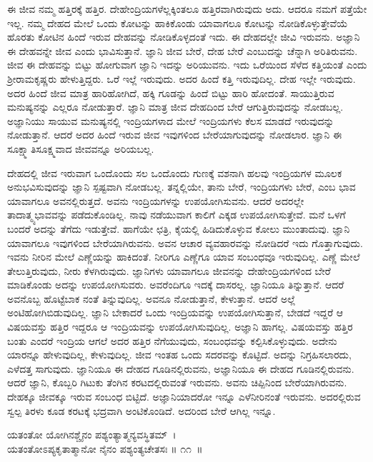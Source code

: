 ಈ ಜೀವ ನಮ್ಮ ಹತ್ತಿರಕ್ಕೆ ಹತ್ತಿರ. ದೇಹೇಂದ್ರಿಯಗಳೆಲ್ಲಕ್ಕಿಂತಲೂ ಹತ್ತಿರವಾಗಿರುವುದು ಅದು. ಆದರೂ ನಮಗೆ ಪತ್ತೆಯೇ ಇಲ್ಲ. ನಮ್ಮ ದೇಹದ ಮೇಲೆ ಒಂದು ಕೋಟನ್ನು ಹಾಕಿಕೊಂಡು ಯಾವಾಗಲೂ ಕೋಟನ್ನು ನೋಡಿಕೊಳ್ಳುತ್ತೇವೆಯೆ ಹೊರತು ಕೋಟಿನ ಹಿಂದೆ ಇರುವ ದೇಹವನ್ನು ನೋಡಿಕೊಳ್ಳದಂತೆ ಇದು. ಈ ದೇಹದಲ್ಲೇ ಜೀವಿ ಇರುವನು. ಅಜ್ಞಾನಿ ಈ ದೇಹವನ್ನೇ ಜೀವ ಎಂದು ಭಾವಿಸುತ್ತಾನೆ. ಜ್ಞಾನಿ ಜೀವ ಬೇರೆ, ದೇಹ ಬೇರೆ ಎಂಬುದನ್ನು ಚೆನ್ನಾಗಿ ಅರಿತಿರುವನು. ಜೀವ ಈ ದೇಹವನ್ನು ಬಿಟ್ಟು ಹೋಗುವಾಗ ಜ್ಞಾನಿ ಇದನ್ನು ಅರಿಯುವನು. ಇದು ಒರೆಯಿಂದ ಸೆಳೆದ ಕತ್ತಿಯಂತೆ ಎಂದು ಶ‍್ರೀರಾಮಕೃಷ್ಣರು ಹೇಳುತ್ತಿದ್ದರು. ಒರೆ ಇಲ್ಲೆ ಇರುವುದು. ಅದರ ಹಿಂದೆ ಕತ್ತಿ ಇರುವುದಿಲ್ಲ. ದೇಹ ಇಲ್ಲೇ ಇರುವುದು. ಅದರ ಹಿಂದೆ ಜೀವ ಮಾತ್ರ ಹಾರಿಹೋಗಿದೆ, ಹಕ್ಕಿ ಗೂಡನ್ನು ಹಿಂದೆ ಬಿಟ್ಟು ಹಾರಿ ಹೋದಂತೆ. ಸಾಯುತ್ತಿರುವ ಮನುಷ್ಯನನ್ನು ಎಲ್ಲರೂ ನೋಡುತ್ತಾರೆ. ಜ್ಞಾನಿ ಮಾತ್ರ ಜೀವ ದೇಹದಿಂದ ಬೇರೆ ಆಗುತ್ತಿರುವುದನ್ನು ನೋಡಬಲ್ಲ. ಅಜ್ಞಾನಿಯು ಸಾಯುವ ಮನುಷ್ಯನಲ್ಲಿ ಇಂದ್ರಿಯಗಳಾದ ಮೇಲೆ ಇಂದ್ರಿಯಗಳು ಕೆಲಸ ಮಾಡದೆ ಇರುವುದನ್ನು ನೋಡುತ್ತಾನೆ. ಆದರೆ ಅದರ ಹಿಂದೆ ಇರುವ ಜೀವ ಇವುಗಳಿಂದ ಬೇರೆಯಾಗುವುದನ್ನು ನೋಡಲಾರ. ಜ್ಞಾನಿ ಈ ಸೂಕ್ಷ್ಮಾತಿಸೂಕ್ಷ್ಮವಾದ ಜೀವವನ್ನೂ ಅರಿಯಬಲ್ಲ.

ದೇಹದಲ್ಲಿ ಜೀವ ಇರುವಾಗ ಒಂದೊಂದು ಸಲ ಒಂದೊಂದು ಗುಣಕ್ಕೆ ವಶನಾಗಿ ಹಲವು ಇಂದ್ರಿಯಗಳ ಮೂಲಕ ಅನುಭವಿಸುವುದನ್ನು ಜ್ಞಾನಿ ಸ್ಪಷ್ಟವಾಗಿ ನೋಡಬಲ್ಲ. ತನ್ನಲ್ಲಿಯೇ, ತಾನು ಬೇರೆ, ಇಂದ್ರಿಯಗಳು ಬೇರೆ, ಎಂಬ ಭಾವ ಯಾವಾಗಲೂ ಅವನಲ್ಲಿರುತ್ತದೆ. ಅವನು ಇಂದ್ರಿಯಗಳನ್ನು ಉಪಯೋಗಿಸುವನು. ಆದರೆ ಅದರಲ್ಲೇ ತಾದಾತ್ಮ್ಯಭಾವವನ್ನು ಪಡೆದುಕೊಂಡಿಲ್ಲ. ನಾವು ನಡೆಯುವಾಗ ಕಾಲಿಗೆ ಎಕ್ಕಡ ಉಪಯೋಗಿಸುತ್ತೇವೆ. ಮನೆ ಒಳಗೆ ಬಂದರೆ ಅದನ್ನು ತೆಗೆದು ಇಡುತ್ತೇವೆ. ಹಾಗೆಯೇ ಛತ್ರಿ, ಕೈಯಲ್ಲಿ ಹಿಡಿದುಕೊಳ್ಳುವ ಕೋಲು ಮುಂತಾದುವು. ಜ್ಞಾನಿ ಯಾವಾಗಲೂ ಇವುಗಳಿಂದ ಬೇರೆಯಾಗಿರುವನು. ಅವನ ಆಚಾರ ವ್ಯವಹಾರವನ್ನು ನೋಡಿದರೆ ಇದು ಗೊತ್ತಾಗುವುದು. ಇವನು ನೀರಿನ ಮೇಲೆ ಎಣ್ಣೆಯನ್ನು ಹಾಕಿದಂತೆ. ನೀರಿಗೂ ಎಣ್ಣೆಗೂ ಯಾವ ಸಂಬಂಧವೂ ಇರುವುದಿಲ್ಲ. ಎಣ್ಣೆ ಮೇಲೆ ತೇಲುತ್ತಿರುವುದು, ನೀರು ಕೆಳಗಿರುವುದು. ಜ್ಞಾನಿಗಳು ಯಾವಾಗಲೂ ಜೀವನನ್ನು ದೇಹೇಂದ್ರಿಯಗಳಿಂದ ಬೇರೆ ಮಾಡಿಕೊಂಡು ಅದನ್ನು ಉಪಯೋಗಿಸುವರು. ಅವರೆಂದಿಗೂ ಇದಕ್ಕೆ ದಾಸರಲ್ಲ. ಜ್ಞಾನಿಯೂ ತಿನ್ನುತ್ತಾನೆ. ಆದರೆ ಅವನೊಬ್ಬ ಹೊಟ್ಟೆಬಾಕ ನಂತೆ ತಿನ್ನುವುದಿಲ್ಲ. ಅವನೂ ನೋಡುತ್ತಾನೆ, ಕೇಳುತ್ತಾನೆ. ಆದರೆ ಅಲ್ಲೆ ಅಂಟಿಹೋಗಿಬಿಡುವುದಿಲ್ಲ. ಜ್ಞಾನಿ ಬೇಕಾದರೆ ಒಂದು ಇಂದ್ರಿಯವನ್ನು ಉಪಯೋಗಿಸುತ್ತಾನೆ, ಬೇಡದೆ ಇದ್ದರೆ ಆ ವಿಷಯವಸ್ತು ಹತ್ತಿರ ಇದ್ದರೂ ಆ ಇಂದ್ರಿಯವನ್ನು ಉಪಯೋಗಿಸುವುದಿಲ್ಲ. ಅಜ್ಞಾನಿ ಹಾಗಲ್ಲ. ವಿಷಯವಸ್ತು ಹತ್ತಿರ ಬಂತು ಎಂದರೆ ಇಂದ್ರಿಯ ಆಗಲೆ ಅದರ ಹತ್ತಿರ ನೆಗೆಯುವುದು, ಸಂಬಂಧವನ್ನು ಕಲ್ಪಿಸಿಕೊಳ್ಳುವುದು. ಅದೇನು ಯಾರನ್ನೂ ಹೇಳುವುದಿಲ್ಲ, ಕೇಳುವುದಿಲ್ಲ. ಜೀವ ಇಂತಹ ಒಂದು ಸದರವನ್ನು ಕೊಟ್ಟಿದೆ. ಅದನ್ನು ನಿಗ್ರಹಿಸಲಾರದು, ಎಳೆದತ್ತ ಸಾಗುವುದು. ಜ್ಞಾನಿಯೂ ಈ ದೇಹದ ಗೂಡಿನಲ್ಲಿರುವನು, ಅಜ್ಞಾನಿಯೂ ಈ ದೇಹದ ಗೂಡಿನಲ್ಲಿರುವನು. ಆದರೆ ಜ್ಞಾನಿ, ಕೊಬ್ಬರಿ ಗಿಟುಕು ತೆಂಗಿನ ಕರಟದಲ್ಲಿರುವಂತೆ ಇರುವನು. ಅವನು ಚಿಪ್ಪಿನಿಂದ ಬೇರೆಯಾಗಿರುವನು. ದೇಹಕ್ಕೂ ಜೀವಕ್ಕೂ ಇರುವ ಸಂಬಂಧ ಬಿಟ್ಟಿದೆ. ಅಜ್ಞಾನಿಯಾದರೋ ಇನ್ನೂ ಎಳೆನೀರಿನಂತೆ ಇರುವನು. ಅದರಲ್ಲಿರುವ ಸ್ವಲ್ಪ ತಿರಳು ಕೂಡ ಕರಟಕ್ಕೆ ಭದ್ರವಾಗಿ ಅಂಟಿಕೊಂಡಿದೆ. ಅದರಿಂದ ಬೇರೆ ಆಗಿಲ್ಲ ಇನ್ನೂ.

\begin{shloka}
ಯತಂತೋ ಯೋಗಿನಶ್ಚೈನಂ ಪಶ್ಯಂತ್ಯಾತ್ಮನ್ಯವಸ್ಥಿತಮ್~।\\ಯತಂತೋಽಪ್ಯಕೃತಾತ್ಮಾನೋ ನೈನಂ ಪಶ್ಯಂತ್ಯಚೇತಸಃ \hfill॥ ೧೧~॥
\end{shloka}

